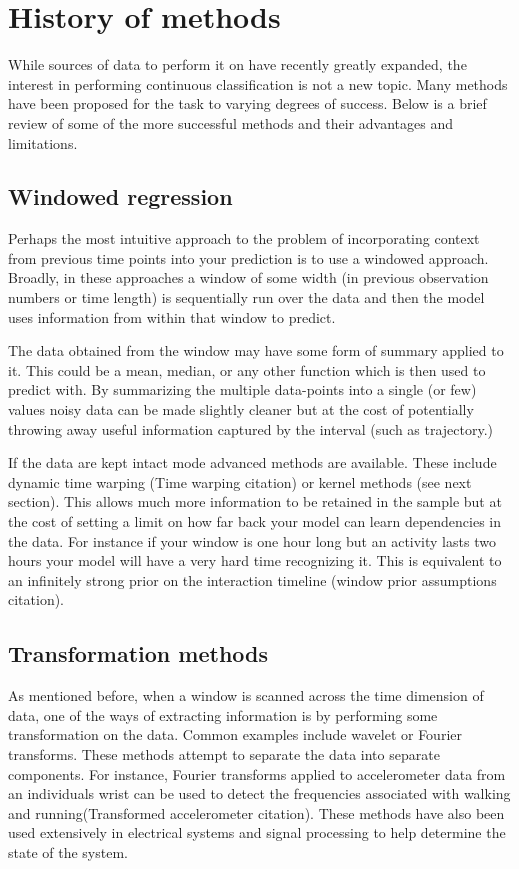 \documentclass[]{book}
\theoremstyle{definition}
\theoremstyle{definition}
\theoremstyle{definition}
\theoremstyle{remark}
\begin{document}
\section{History of methods}\label{history-of-methods}

While sources of data to perform it on have recently greatly expanded,
the interest in performing continuous classification is not a new topic.
Many methods have been proposed for the task to varying degrees of
success. Below is a brief review of some of the more successful methods
and their advantages and limitations.

\subsection{Windowed regression}\label{windowed-regression}

Perhaps the most intuitive approach to the problem of incorporating
context from previous time points into your prediction is to use a
windowed approach. Broadly, in these approaches a window of some width
(in previous observation numbers or time length) is sequentially run
over the data and then the model uses information from within that
window to predict.

The data obtained from the window may have some form of summary applied
to it. This could be a mean, median, or any other function which is then
used to predict with. By summarizing the multiple data-points into a
single (or few) values noisy data can be made slightly cleaner but at
the cost of potentially throwing away useful information captured by the
interval (such as trajectory.)

If the data are kept intact mode advanced methods are available. These
include dynamic time warping (Time warping citation) or kernel methods
(see next section). This allows much more information to be retained in
the sample but at the cost of setting a limit on how far back your model
can learn dependencies in the data. For instance if your window is one
hour long but an activity lasts two hours your model will have a very
hard time recognizing it. This is equivalent to an infinitely strong
prior on the interaction timeline (window prior assumptions citation).

\subsection{Transformation methods}\label{transformation-methods}

As mentioned before, when a window is scanned across the time dimension
of data, one of the ways of extracting information is by performing some
transformation on the data. Common examples include wavelet or Fourier
transforms. These methods attempt to separate the data into separate
components. For instance, Fourier transforms applied to accelerometer
data from an individuals wrist can be used to detect the frequencies
associated with walking and running(Transformed accelerometer citation).
These methods have also been used extensively in electrical systems and
signal processing to help determine the state of the system.
\end{document}
